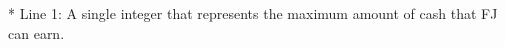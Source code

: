 * Line 1: A single integer that represents the maximum amount of cash         that FJ can earn.  

\